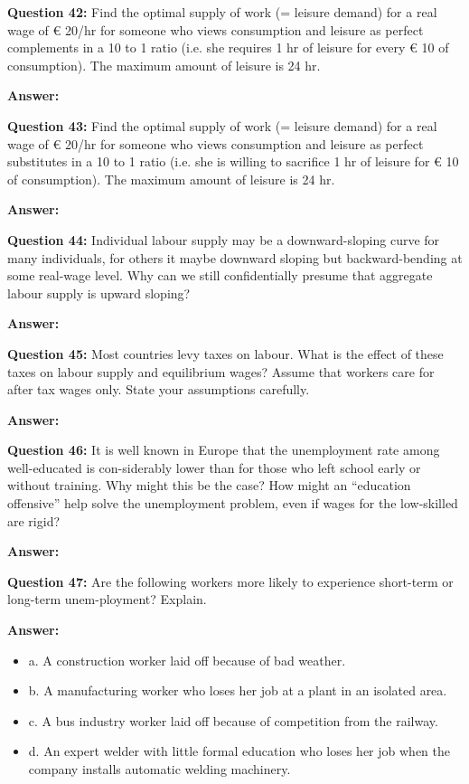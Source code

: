 \documentclass[a4paper, 11pt]{article}
\begin{document}
\textbf{Question 42:} Find the optimal supply of work (= leisure demand) for a real wage of € 20/hr for someone who views consumption and leisure as perfect complements in a 10 to 1 ratio (i.e. she requires 1 hr of leisure for every € 10 of consumption). The maximum amount of leisure is 24 hr.

\textbf{Answer:}

\textbf{Question 43:} Find the optimal supply of work (= leisure demand) for a real wage of € 20/hr for someone who views consumption and leisure as perfect substitutes in a 10 to 1 ratio (i.e. she is willing to sacrifice 1 hr of leisure for € 10 of consumption). The maximum amount of leisure is 24 hr.

\textbf{Answer:}

\textbf{Question 44:} Individual labour supply may be a downward-sloping curve for many individuals, for others it maybe downward sloping but backward-bending at some real-wage level. Why can we still confidentially presume that aggregate labour supply is upward sloping?

\textbf{Answer:}

\textbf{Question 45:} Most countries levy taxes on labour. What is the effect of these taxes on labour supply and equilibrium wages? Assume that workers care for after tax wages only. State your assumptions carefully.

\textbf{Answer:}

\textbf{Question 46:} It is well known in Europe that the unemployment rate among well-educated is con-siderably lower than for those who left school early or without training. Why might this be the case? How might an “education offensive” help solve the unemployment problem, even if wages for the low-skilled are rigid?

\textbf{Answer:}

\textbf{Question 47:} Are the following workers more likely to experience short-term or long-term unem-ployment? Explain.

\textbf{Answer:}
\begin{itemize}
\item a. A construction worker laid off because of bad weather.
\item b. A manufacturing worker who loses her job at a plant in an isolated area.
\item c. A bus industry worker laid off because of competition from the railway.
\item d. An expert welder with little formal education who loses her job when the company installs automatic welding machinery.

\end{itemize}
\end{document}
